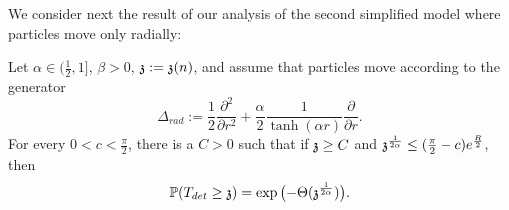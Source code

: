 \smallskip
We consider next the result of our analysis of the second simplified model where particles move only radially:
\begin{theorem}{\label{thm:radialmain}}
Let $\alpha\in(\tfrac{1}{2},1]$, $\beta>0$, $\ss:=\ss(n)$,
and assume that particles move according to the generator 
\begin{equation*}\label{radialgenerator}
	\Delta_{rad} := \frac{1}{2}\frac{\partial^2}{\partial r^2}+\frac{\alpha}{2}\frac{1}{\tanh(\alpha r)}\frac{\partial}{\partial r}.
\end{equation*}
For every $0<c<\frac{\pi}{2}$, there is a $C>0$ such that if  $\ss\ge C$ and $\ss^{\frac{1}{2\alpha}}\le (\frac{\pi}{2}-c)e^{\frac{R}{2}}$, then
\[
\P(T_{det}\geq \ss) = \exp\big({-}\Theta(\ss^{\frac{1}{2\alpha}})\big).
\]
\end{theorem}

